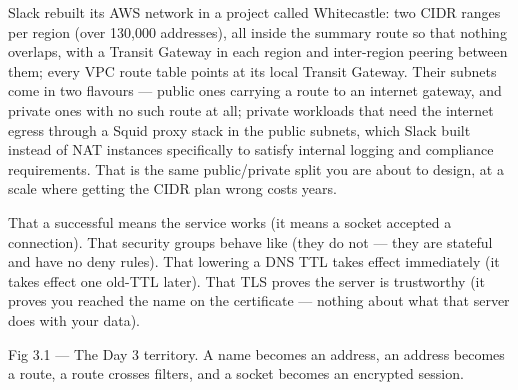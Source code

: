  Slack rebuilt its AWS network in a project called Whitecastle: two  CIDR ranges per region (over 130{,}000 addresses), all inside the  summary route so that nothing overlaps, with a Transit Gateway in each region and inter-region peering between them; every VPC route table points  at its local Transit Gateway. Their subnets come in two flavours --- public ones carrying a  route to an internet gateway, and private ones with no such route at all; private workloads that need the internet egress through a Squid proxy stack in the public subnets, which Slack built instead of NAT instances specifically to satisfy internal logging and compliance requirements. That is the same public/private split you are about to design, at a scale where getting the CIDR plan wrong costs years.

 That a successful  means the service works (it means a socket accepted a connection). That security groups behave like  (they do not --- they are stateful and have no deny rules). That lowering a DNS TTL takes effect immediately (it takes effect one old-TTL later). That TLS proves the server is trustworthy (it proves you reached the name on the certificate --- nothing about what that server does with your data).


\begin{wbfigure}{Fig 3.1 — The Day 3 territory. A name becomes an address, an address becomes a route, a route crosses filters, and a socket becomes an encrypted session.}
\end{wbfigure}

